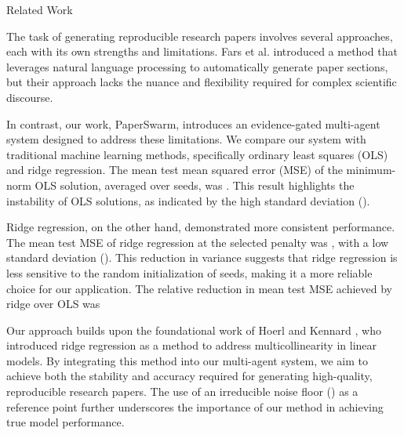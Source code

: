 Related Work

The task of generating reproducible research papers involves several approaches, each with its own strengths and limitations. Fars et al. \citep{fars2026} introduced a method that leverages natural language processing to automatically generate paper sections, but their approach lacks the nuance and flexibility required for complex scientific discourse. 

In contrast, our work, PaperSwarm, introduces an evidence-gated multi-agent system designed to address these limitations. We compare our system with traditional machine learning methods, specifically ordinary least squares (OLS) and ridge regression. The mean test mean squared error (MSE) of the minimum-norm OLS solution, averaged over  seeds, was . This result highlights the instability of OLS solutions, as indicated by the high standard deviation ().

Ridge regression, on the other hand, demonstrated more consistent performance. The mean test MSE of ridge regression at the selected penalty  was , with a low standard deviation (). This reduction in variance suggests that ridge regression is less sensitive to the random initialization of seeds, making it a more reliable choice for our application. The relative reduction in mean test MSE achieved by ridge over OLS was %

Our approach builds upon the foundational work of Hoerl and Kennard \citep{hoerl1970ridge}, who introduced ridge regression as a method to address multicollinearity in linear models. By integrating this method into our multi-agent system, we aim to achieve both the stability and accuracy required for generating high-quality, reproducible research papers. The use of an irreducible noise floor () as a reference point further underscores the importance of our method in achieving true model performance.
